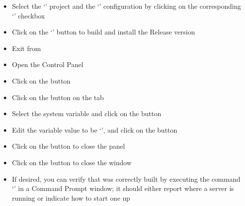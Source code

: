 \begin{itemize}
\item\exSp{}Select the `' project and the `'
configuration by clicking on the corresponding `' checkbox
\item\exSp{}Click on the `' button to build and install the Release version
\item\exSp{}Exit from 
\item\exSp{}Open the  Control Panel
\item\exSp{}Click on the  button
\item\exSp{}Click on the  button on the 
tab
\item\exSp{}Select the  system variable and click on the
 button 
\item\exSp{}Edit the variable value to be
`', and click on the 
button
\item\exSp{}Click on the  button to close the 
panel
\item\exSp{}Click on the  button to close the 
window
\item\exSp{}If desired, you can verify that \yarp{} was correctly built by executing the
command `' in a Command Prompt window; it should either report where a
\yarp{} server is running or indicate how to start one up
\end{itemize}
\tertiaryEnd
{}
